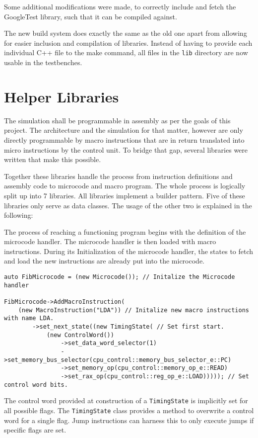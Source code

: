 Some additional modifications were made, to correctly include and fetch the GoogleTest library, such that it can be compiled against. 

The new build system does exactly the same as the old one apart from allowing for easier inclusion and compilation of libraries. Instead of having to provide each individual C++ file to the make command, all files in the \texttt{lib} directory are now usable in the testbenches.

\section{Helper Libraries}
The simulation shall be programmable in assembly as per the goals of this project. The architecture and the simulation for that matter, however are only directly programmable by macro instructions that are in return translated into micro instructions by the control unit. To bridge that gap, several libraries were written that make this possible. 

Together these libraries handle the process from instruction definitions and assembly code to microcode and macro program. The whole process is logically split up into 7 libraries. All libraries implement a builder pattern. Five of these libraries only serve as data classes. The usage of the other two is explained in the following:

The process of reaching a functioning program begins with the definition of the microcode handler. The microcode handler is then loaded with macro instructions. During its Initialization of the microcode handler, the states to fetch and load the new instructions are already put into the microcode.

\begin{lstlisting}[caption=Initialization of the Microcode]
auto FibMicrocode = (new Microcode()); // Initalize the Microcode handler

FibMicrocode->AddMacroInstruction( 
    (new MacroInstruction("LDA")) // Initalize new macro instructions with name LDA. 
        ->set_next_state((new TimingState( // Set first start. 
            (new ControlWord()) 
                ->set_data_word_selector(1)
                ->set_memory_bus_selector(cpu_control::memory_bus_selector_e::PC)
                ->set_memory_op(cpu_control::memory_op_e::READ)
                ->set_rax_op(cpu_control::reg_op_e::LOAD))))); // Set control word bits.
\end{lstlisting}

The control word provided at construction of a \texttt{TimingState} is implicitly set for all possible flags. The \texttt{TimingState} class provides a method to overwrite a control word for a single flag. Jump instructions can harness this to only execute jumps if specific flags are set.

